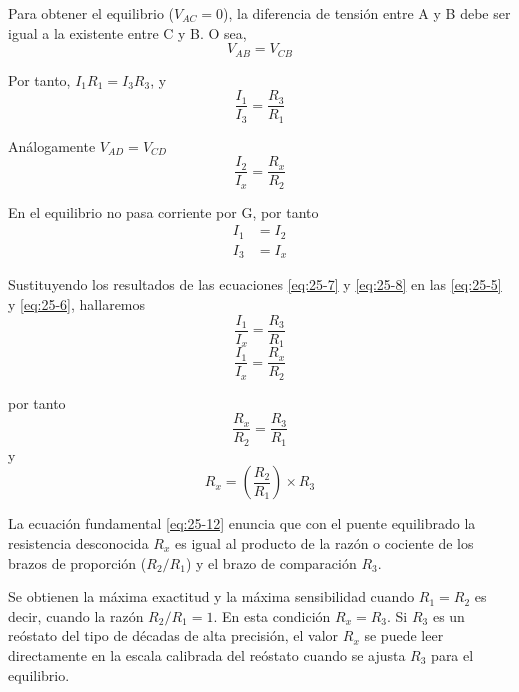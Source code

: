 \documentclass{article}
\numberwithin{equation}{subsection}
\numberwithin{figure}{section}
\numberwithin{table}{section}
\begin{document}
Para obtener el equilibrio ($V_{AC} = 0$), la diferencia de tensión entre A y B debe ser igual a la existente 
entre C y B. O sea,
\begin{equation}
    V_{AB} = V_{CB} \label{eq:25-4}
\end{equation}

Por tanto, $I_1 R_1 = I_3 R_3$, y
\begin{equation}
    \frac{I_1}{I_3} = \frac{R_3}{R_1} \label{eq:25-5}
\end{equation}

Análogamente $V_{AD} = V_{CD}$
\begin{equation}
    \frac{I_2}{I_x} = \frac{R_x}{R_2} \label{eq:25-6}
\end{equation}

En el equilibrio no pasa corriente por G, por tanto
\begin{align}
    I_1 &= I_2 \label{eq:25-7} \\
    I_3 &= I_x \label{eq:25-8}
\end{align}

Sustituyendo los resultados de las ecuaciones \eqref{eq:25-7} y \eqref{eq:25-8} en las \eqref{eq:25-5} y \eqref{eq:25-6}, hallaremos
\begin{equation}
    \frac{I_1}{I_x} = \frac{R_3}{R_1} \label{eq:25-9}
\end{equation}
\begin{equation}
    \frac{I_1}{I_x} = \frac{R_x}{R_2} \label{eq:25-10}
\end{equation}

por tanto
\begin{equation}
    \frac{R_x}{R_2} = \frac{R_3}{R_1} \label{eq:25-11}
\end{equation}
y
\begin{equation}
    R_x = \left( \frac{R_2}{R_1} \right) \times R_3 \label{eq:25-12}
\end{equation}

La ecuación fundamental \eqref{eq:25-12} enuncia que con el puente equilibrado la resistencia desconocida $R_x$ 
es igual al producto de la razón o cociente de los brazos de proporción ($R_2/R_1$) y el brazo de 
comparación $R_3$.

Se obtienen la máxima exactitud y la máxima sensibilidad cuando $R_1 = R_2$ es decir, cuando la razón 
$R_2/R_1 = 1$. En esta condición $R_x = R_3$. Si $R_3$ es un reóstato del tipo de décadas de alta precisión, 
el valor $R_x$ se puede leer directamente en la escala calibrada del reóstato cuando se ajusta $R_3$ para 
el equilibrio.
\end{document}
